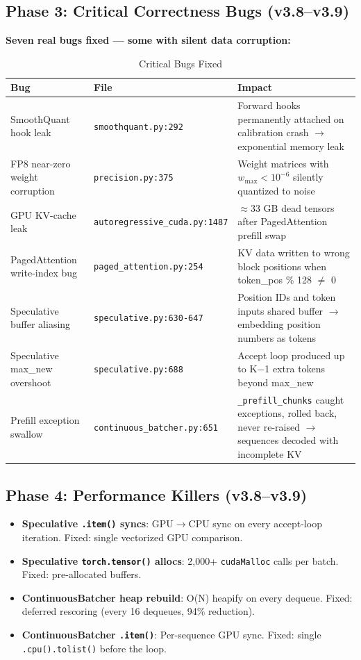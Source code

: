 \documentclass[11pt,a4paper,twoside]{article}
\begin{document}
\subsection{Phase 3: Critical Correctness Bugs (v3.8--v3.9)}

\textbf{Seven real bugs fixed --- some with silent data corruption:}

\begin{table}[H]
\centering
\caption{Critical Bugs Fixed}
\label{tab:bugs}
\begin{tabular}{lp{5cm}p{6cm}}
\toprule
\textbf{Bug} & \textbf{File} & \textbf{Impact} \\
\midrule
SmoothQuant hook leak & \texttt{smoothquant.py:292} & Forward hooks permanently attached on calibration crash $\rightarrow$ exponential memory leak \\
FP8 near-zero weight corruption & \texttt{precision.py:375} & Weight matrices with $w_{\max} < 10^{-6}$ silently quantized to noise \\
GPU KV-cache leak & \texttt{autoregressive\_cuda.py:1487} & $\approx$33 GB dead tensors after PagedAttention prefill swap \\
PagedAttention write-index bug & \texttt{paged\_attention.py:254} & KV data written to wrong block positions when token\_pos \% 128 $\neq$ 0 \\
Speculative buffer aliasing & \texttt{speculative.py:630-647} & Position IDs and token inputs shared buffer $\rightarrow$ embedding position numbers as tokens \\
Speculative max\_new overshoot & \texttt{speculative.py:688} & Accept loop produced up to K$-$1 extra tokens beyond max\_new \\
Prefill exception swallow & \texttt{continuous\_batcher.py:651} & \texttt{\_prefill\_chunks} caught exceptions, rolled back, never re-raised $\rightarrow$ sequences decoded with incomplete KV \\
\bottomrule
\end{tabular}
\end{table}

\subsection{Phase 4: Performance Killers (v3.8--v3.9)}

\begin{itemize}[nosep]
  \item \textbf{Speculative \texttt{.item()} syncs}: GPU$\rightarrow$CPU sync on every
    accept-loop iteration. Fixed: single vectorized GPU comparison.
  \item \textbf{Speculative \texttt{torch.tensor()} allocs}: 2,000+ \texttt{cudaMalloc}
    calls per batch. Fixed: pre-allocated buffers.
  \item \textbf{ContinuousBatcher heap rebuild}: O(N) heapify on every dequeue.
    Fixed: deferred rescoring (every 16 dequeues, 94\% reduction).
  \item \textbf{ContinuousBatcher \texttt{.item()}}: Per-sequence GPU sync.
    Fixed: single \texttt{.cpu().tolist()} before the loop.
\end{itemize}
\end{document}
